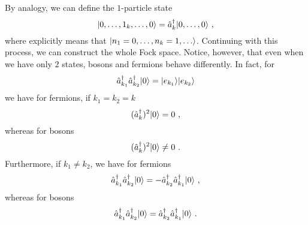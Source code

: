     By analogy, we can define the $1$-particle state
    \begin{equation*}
        \vert0, \ldots, 1_k, \ldots, 0\rangle = \hat a_k^\dagger \vert0, \ldots, 0\rangle ~,
    \end{equation*}
    where explicitly means that $\vert n_1=0, \ldots, n_k=1, \ldots\rangle$. Continuing with this process, we can construct the whole Fock space. Notice, however, that even when we have only $2$ states, bosons and fermions behave differently. In fact, for
    \begin{equation*}
        \hat a_{k_1}^\dagger \hat a_{k_2}^\dagger \vert0\rangle = \vert e_{k_1}\rangle \vert e_{k_2}\rangle 
    \end{equation*}
    we have for fermions, if $k_1 = k_2 = k$
    \begin{equation*}
    (\hat a^\dagger_k)^2 \vert0\rangle = 0 ~,
    \end{equation*}
    whereas for bosons 
    \begin{equation*}
        (\hat a^\dagger_k)^2 \vert0\rangle \neq 0 ~.
    \end{equation*}
    Furthermore, if $k_1 \neq  k_2$, we have for fermions
    \begin{equation*}
        \hat a^\dagger_{k_1} \hat a^\dagger_{k_2} \vert0\rangle = - \hat a^\dagger_{k_2} \hat a^\dagger_{k_1} \vert0\rangle ~,
    \end{equation*}
    whereas for bosons 
    \begin{equation*}
        \hat a^\dagger_{k_1} \hat a^\dagger_{k_2} \vert0\rangle = \hat a^\dagger_{k_2} \hat a^\dagger_{k_1} \vert0\rangle ~.
    \end{equation*}


